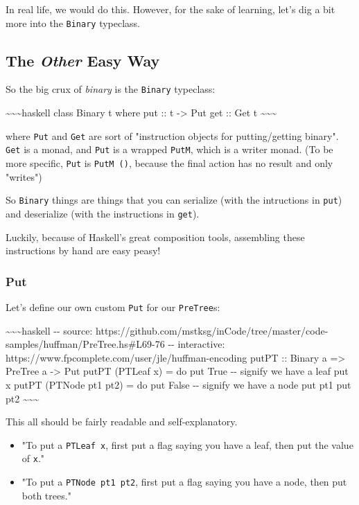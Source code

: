 \documentclass[]{article}
\begin{document}
In real life, we would do this. However, for the sake of learning, let's dig a
bit more into the \texttt{Binary} typeclass.

\subsection{\texorpdfstring{The \emph{Other} Easy Way}{The Other Easy Way}}

So the big crux of \emph{binary} is the \texttt{Binary} typeclass:

\textasciitilde{}\textasciitilde{}\textasciitilde{}haskell class Binary t where
put :: t -\textgreater{} Put get :: Get t
\textasciitilde{}\textasciitilde{}\textasciitilde{}

where \texttt{Put} and \texttt{Get} are sort of "instruction objects for
putting/getting binary". \texttt{Get} is a monad, and \texttt{Put} is a wrapped
\texttt{PutM}, which is a writer monad. (To be more specific, \texttt{Put} is
\texttt{PutM\ ()}, because the final action has no result and only "writes")

So \texttt{Binary} things are things that you can serialize (with the
intructions in \texttt{put}) and deserialize (with the instructions in
\texttt{get}).

Luckily, because of Haskell's great composition tools, assembling these
instructions by hand are easy peasy!

\subsubsection{Put}

Let's define our own custom \texttt{Put} for our \texttt{PreTree}s:

\textasciitilde{}\textasciitilde{}\textasciitilde{}haskell -\/- source:
https://github.com/mstksg/inCode/tree/master/code-samples/huffman/PreTree.hs\#L69-76
-\/- interactive: https://www.fpcomplete.com/user/jle/huffman-encoding putPT ::
Binary a =\textgreater{} PreTree a -\textgreater{} Put putPT (PTLeaf x) = do put
True -\/- signify we have a leaf put x putPT (PTNode pt1 pt2) = do put False
-\/- signify we have a node put pt1 put pt2
\textasciitilde{}\textasciitilde{}\textasciitilde{}

This all should be fairly readable and self-explanatory.

\begin{itemize}
\item
  "To put a \texttt{PTLeaf\ x}, first put a flag saying you have a leaf, then
  put the value of \texttt{x}."
\item
  "To put a \texttt{PTNode\ pt1\ pt2}, first put a flag saying you have a node,
  then put both trees."
\end{itemize}
\end{document}
